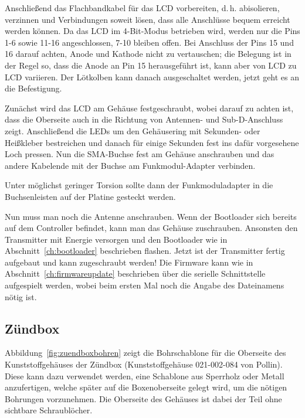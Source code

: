 \documentclass[paper=a4, parskip, numbers=noenddot, toc=listof, headsepline]{scrbook}
\begin{document}
			  Anschließend das Flachbandkabel für das LCD vorbereiten, d.\,h. abisolieren, verzinnen und Verbindungen soweit lösen, dass alle Anschlüsse bequem erreicht werden können. Da das LCD im 4-Bit-Modus betrieben wird, werden nur die Pins 1-6 sowie 11-16 angeschlossen, 7-10 bleiben offen. Bei Anschluss der Pins 15 und 16 darauf achten, Anode und Kathode nicht zu vertauschen; die Belegung ist in der Regel so, dass die Anode an Pin 15 herausgeführt ist, kann aber von LCD zu LCD variieren. Der Lötkolben kann danach ausgeschaltet werden, jetzt geht es an die Befestigung.

			  Zunächst wird das LCD am Gehäuse festgeschraubt, wobei darauf zu achten ist, dass die Oberseite auch in die Richtung von Antennen- und Sub-D-Anschluss zeigt. Anschließend die LEDs um den Gehäusering mit Sekunden- oder Heißkleber bestreichen und danach für einige Sekunden fest ins dafür vorgesehene Loch pressen. Nun die SMA-Buchse fest am Gehäuse anschrauben und das andere Kabelende mit der Buchse am Funkmodul-Adapter verbinden.

			  Unter möglichst geringer Torsion sollte dann der Funkmoduladapter in die Buchsenleisten auf der Platine gesteckt werden.

			  Nun muss man noch die Antenne anschrauben. Wenn der Bootloader sich bereits auf dem Controller befindet, kann man das Gehäuse zuschrauben. Ansonsten den Transmitter mit Energie versorgen und den Bootloader wie in Abschnitt~\ref{ch:bootloader} beschrieben flashen. Jetzt ist der Transmitter fertig aufgebaut und kann zugeschraubt werden! Die Firmware kann wie in Abschnitt~\ref{ch:firmwareupdate} beschrieben über die serielle Schnittstelle aufgespielt werden, wobei beim ersten Mal noch die Angabe des Dateinamens nötig ist.

		  \subsection{Zündbox}
			  Abbildung~\ref{fig:zuendboxbohren} zeigt die Bohrschablone für die Oberseite des Kunststoffgehäuses der Zündbox (Kunststoffgehäuse 021-002-084 von Pollin). Diese kann dazu verwendet werden, eine Schablone aus Sperrholz oder Metall anzufertigen, welche später auf die Boxenoberseite gelegt wird, um die nötigen Bohrungen vorzunehmen. Die Oberseite des Gehäuses ist dabei der Teil ohne sichtbare Schraublöcher.
\end{document}

